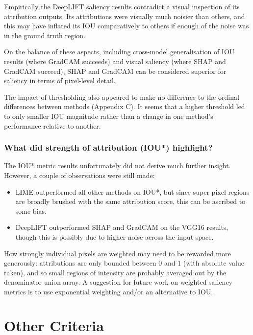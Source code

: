 \documentclass[main]{subfiles}
\begin{document}
Empirically the DeepLIFT saliency results contradict a visual inspection of its attribution outputs. Its attributions were visually much noisier than others, and this may have inflated its IOU comparatively to others if enough of the noise was in the ground truth region. 

On the balance of these aspects, including cross-model generalisation of IOU results (where GradCAM succeeds) and visual saliency (where SHAP and GradCAM succeed), SHAP and GradCAM can be considered superior for saliency in terms of pixel-level detail. 
 
The impact of thresholding also appeared to make no difference to the ordinal differences between methods (Appendix C). It seems that a higher threshold led to only smaller IOU magnitude rather than a change in one method's performance relative to another. 


\subsubsection{What did strength of attribution (IOU*) highlight?}

The IOU* metric results unfortunately did not derive much further insight. However, a couple of observations were still made:
\begin{itemize}
\item LIME outperformed all other methods on IOU*, but since super pixel regions are broadly brushed with the same attribution score, this can be ascribed to some bias.
\item DeepLIFT outperformed SHAP and GradCAM on the VGG16 results, though this is possibly due to higher noise across the input space.
\end{itemize}

\noindent How strongly individual pixels are weighted may need to be rewarded more generously: attributions are only bounded between 0 and 1 (with absolute value taken), and so small regions of intensity are probably averaged out by the denominator union array. A suggestion for future work on weighted saliency metrics is to use exponential weighting and/or an alternative to IOU.

\newpage
\section{Other Criteria}
\end{document}

